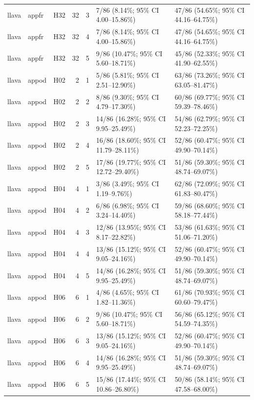 \begin{longtable}{lllrrll}
llava & appfr & H32 & 32 & 3 & 7/86 (8.14\%; 95\% CI 4.00–15.86\%) & 47/86 (54.65\%; 95\% CI 44.16–64.75\%) \\
llava & appfr & H32 & 32 & 4 & 7/86 (8.14\%; 95\% CI 4.00–15.86\%) & 47/86 (54.65\%; 95\% CI 44.16–64.75\%) \\
llava & appfr & H32 & 32 & 5 & 9/86 (10.47\%; 95\% CI 5.60–18.71\%) & 45/86 (52.33\%; 95\% CI 41.90–62.55\%) \\
llava & appod & H02 & 2 & 1 & 5/86 (5.81\%; 95\% CI 2.51–12.90\%) & 63/86 (73.26\%; 95\% CI 63.05–81.47\%) \\
llava & appod & H02 & 2 & 2 & 8/86 (9.30\%; 95\% CI 4.79–17.30\%) & 60/86 (69.77\%; 95\% CI 59.39–78.46\%) \\
llava & appod & H02 & 2 & 3 & 14/86 (16.28\%; 95\% CI 9.95–25.49\%) & 54/86 (62.79\%; 95\% CI 52.23–72.25\%) \\
llava & appod & H02 & 2 & 4 & 16/86 (18.60\%; 95\% CI 11.79–28.11\%) & 52/86 (60.47\%; 95\% CI 49.90–70.14\%) \\
llava & appod & H02 & 2 & 5 & 17/86 (19.77\%; 95\% CI 12.72–29.40\%) & 51/86 (59.30\%; 95\% CI 48.74–69.07\%) \\
llava & appod & H04 & 4 & 1 & 3/86 (3.49\%; 95\% CI 1.19–9.76\%) & 62/86 (72.09\%; 95\% CI 61.83–80.47\%) \\
llava & appod & H04 & 4 & 2 & 6/86 (6.98\%; 95\% CI 3.24–14.40\%) & 59/86 (68.60\%; 95\% CI 58.18–77.44\%) \\
llava & appod & H04 & 4 & 3 & 12/86 (13.95\%; 95\% CI 8.17–22.82\%) & 53/86 (61.63\%; 95\% CI 51.06–71.20\%) \\
llava & appod & H04 & 4 & 4 & 13/86 (15.12\%; 95\% CI 9.05–24.16\%) & 52/86 (60.47\%; 95\% CI 49.90–70.14\%) \\
llava & appod & H04 & 4 & 5 & 14/86 (16.28\%; 95\% CI 9.95–25.49\%) & 51/86 (59.30\%; 95\% CI 48.74–69.07\%) \\
llava & appod & H06 & 6 & 1 & 4/86 (4.65\%; 95\% CI 1.82–11.36\%) & 61/86 (70.93\%; 95\% CI 60.60–79.47\%) \\
llava & appod & H06 & 6 & 2 & 9/86 (10.47\%; 95\% CI 5.60–18.71\%) & 56/86 (65.12\%; 95\% CI 54.59–74.35\%) \\
llava & appod & H06 & 6 & 3 & 13/86 (15.12\%; 95\% CI 9.05–24.16\%) & 52/86 (60.47\%; 95\% CI 49.90–70.14\%) \\
llava & appod & H06 & 6 & 4 & 14/86 (16.28\%; 95\% CI 9.95–25.49\%) & 51/86 (59.30\%; 95\% CI 48.74–69.07\%) \\
llava & appod & H06 & 6 & 5 & 15/86 (17.44\%; 95\% CI 10.86–26.80\%) & 50/86 (58.14\%; 95\% CI 47.58–68.00\%) \\

\end{longtable}
